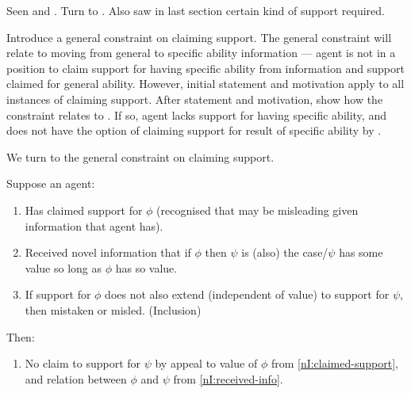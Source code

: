 \begin{note}
  Seen \uRa{} and \WR{}.
  Turn to \AR{}.
  Also saw in last section certain kind of support required.

  Introduce a general constraint on claiming support.
  The general constraint will relate to moving from general to specific ability information --- agent is not in a position to claim support for having specific ability from information and support claimed for general ability.
  However, initial statement and motivation apply to all instances of claiming support.
  After statement and motivation, show how the constraint relates to \AR{}.
  If so, agent lacks support for having specific ability, and does not have the option of claiming support for result of specific ability by \AR{}.
\end{note}

\begin{note}[\nI{}]
  We turn to the general constraint on claiming support.
  \begin{proposition}[\nI{-}  --- \nI{}]\label{prem:ni}
    Suppose an agent:
    \begin{enumerate}
    \item\label{nI:claimed-support} Has claimed support for \(\phi\) (recognised that may be misleading given information that agent has).
    \item\label{nI:received-info} Received novel information that if \(\phi\) then \(\psi\) is (also) the case/\(\psi\) has some value so long as \(\phi\) has so value.
    \item\label{nI:inclusion} If support for \(\phi\) does not also extend (independent of value) to support for \(\psi\), then mistaken or misled. (Inclusion)
    \end{enumerate}
    Then:
    \begin{enumerate}[resume]
    \item\label{nI:going-by-value} No claim to support for \(\psi\) by appeal to value of \(\phi\) from \ref{nI:claimed-support}, and relation between \(\phi\) and \(\psi\) from \ref{nI:received-info}.
    \end{enumerate}
  \end{proposition}
\end{note}


